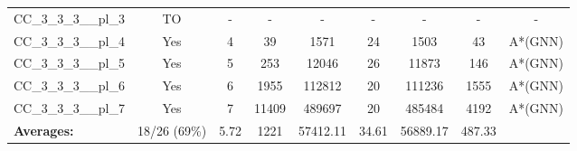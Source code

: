 \documentclass{article}
\begin{document}
\begin{tabular}{lcccccccc}
CC\_3\_3\_3\_\_pl\_3 & TO & - & - & - & - & - & - & - \\
CC\_3\_3\_3\_\_pl\_4 & Yes & 4 & 39 & 1571 & 24 & 1503 & 43 & A*(GNN) \\
CC\_3\_3\_3\_\_pl\_5 & Yes & 5 & 253 & 12046 & 26 & 11873 & 146 & A*(GNN) \\
CC\_3\_3\_3\_\_pl\_6 & Yes & 6 & 1955 & 112812 & 20 & 111236 & 1555 & A*(GNN) \\
CC\_3\_3\_3\_\_pl\_7 & Yes & 7 & 11409 & 489697 & 20 & 485484 & 4192 & A*(GNN) \\
\textbf{Averages:} & 18/26 (69\%) & 5.72 & 1221 & 57412.11 & 34.61 & 56889.17 & 487.33 & \\
\bottomrule
\end{tabular}
\\[0.7cm]
\end{document}
